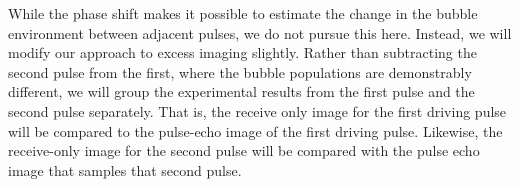 While the phase shift makes it possible to estimate
the change in the bubble environment between adjacent pulses,
we do not pursue this here.
Instead, 
we will modify our approach to excess imaging slightly.
Rather than subtracting the second pulse from the first,
where the bubble populations are demonstrably different,
we will group the experimental results 
from the first pulse and the second pulse separately.
That is, 
the receive only image for the first driving pulse will
be compared to the pulse-echo image of the first driving pulse.
Likewise,
the receive-only image for the second pulse will be compared with
the pulse echo image that samples that second pulse.







